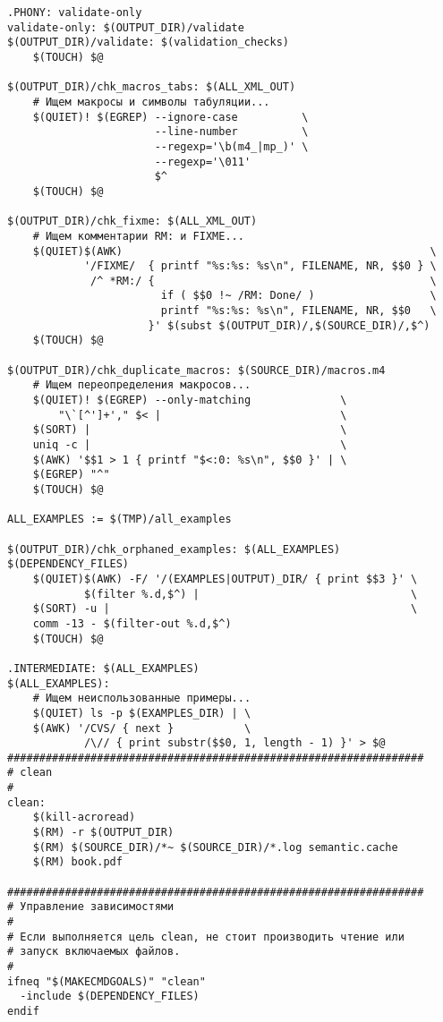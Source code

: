 \begin{verbatim}
.PHONY: validate-only
validate-only: $(OUTPUT_DIR)/validate
$(OUTPUT_DIR)/validate: $(validation_checks)
    $(TOUCH) $@

$(OUTPUT_DIR)/chk_macros_tabs: $(ALL_XML_OUT)
    # Ищем макросы и символы табуляции...
    $(QUIET)! $(EGREP) --ignore-case          \
                       --line-number          \
                       --regexp='\b(m4_|mp_)' \
                       --regexp='\011'
                       $^
    $(TOUCH) $@

$(OUTPUT_DIR)/chk_fixme: $(ALL_XML_OUT)
    # Ищем комментарии RM: и FIXME...
    $(QUIET)$(AWK)                                                \
            '/FIXME/  { printf "%s:%s: %s\n", FILENAME, NR, $$0 } \
             /^ *RM:/ {                                           \
                        if ( $$0 !~ /RM: Done/ )                  \
                        printf "%s:%s: %s\n", FILENAME, NR, $$0   \
                      }' $(subst $(OUTPUT_DIR)/,$(SOURCE_DIR)/,$^) 
    $(TOUCH) $@ 

$(OUTPUT_DIR)/chk_duplicate_macros: $(SOURCE_DIR)/macros.m4
    # Ищем переопределения макросов...
    $(QUIET)! $(EGREP) --only-matching              \
        "\`[^']+'," $< |                            \
    $(SORT) |                                       \
    uniq -c |                                       \
    $(AWK) '$$1 > 1 { printf "$<:0: %s\n", $$0 }' | \
    $(EGREP) "^"
    $(TOUCH) $@

ALL_EXAMPLES := $(TMP)/all_examples

$(OUTPUT_DIR)/chk_orphaned_examples: $(ALL_EXAMPLES) $(DEPENDENCY_FILES)
    $(QUIET)$(AWK) -F/ '/(EXAMPLES|OUTPUT)_DIR/ { print $$3 }' \
            $(filter %.d,$^) |                                 \
    $(SORT) -u |                                               \
    comm -13 - $(filter-out %.d,$^)
    $(TOUCH) $@

.INTERMEDIATE: $(ALL_EXAMPLES)
$(ALL_EXAMPLES):
    # Ищем неиспользованные примеры...
    $(QUIET) ls -p $(EXAMPLES_DIR) | \
    $(AWK) '/CVS/ { next }           \
            /\// { print substr($$0, 1, length - 1) }' > $@
#################################################################
# clean
#
clean:
    $(kill-acroread)
    $(RM) -r $(OUTPUT_DIR)
    $(RM) $(SOURCE_DIR)/*~ $(SOURCE_DIR)/*.log semantic.cache
    $(RM) book.pdf

#################################################################
# Управление зависимостями
#
# Если выполняется цель clean, не стоит производить чтение или
# запуск включаемых файлов.
#
ifneq "$(MAKECMDGOALS)" "clean"
  -include $(DEPENDENCY_FILES)
endif


\end{verbatim}
